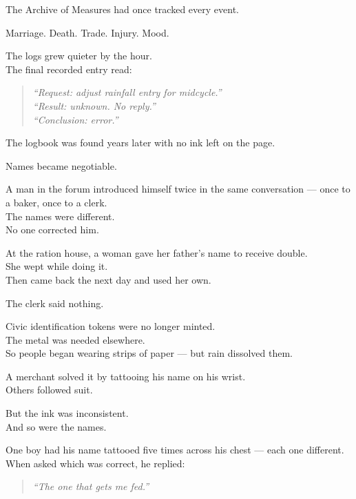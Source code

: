 \documentclass[9pt]{article}
\begin{document}
\vspace{1em}

The Archive of Measures had once tracked every event.

Marriage. Death. Trade. Injury. Mood.

The logs grew quieter by the hour.\\
The final recorded entry read:

\begin{quote}
\textit{“Request: adjust rainfall entry for midcycle.”}\\
\textit{“Result: unknown. No reply.”}\\
\textit{“Conclusion: error.”}
\end{quote}

The logbook was found years later with no ink left on the page.

\vspace{1em}

Names became negotiable.

A man in the forum introduced himself twice in the same conversation — once to a baker, once to a clerk.\\
The names were different.\\
No one corrected him.

At the ration house, a woman gave her father’s name to receive double.\\
She wept while doing it.\\
Then came back the next day and used her own.

The clerk said nothing.

\vspace{1em}

Civic identification tokens were no longer minted.\\
The metal was needed elsewhere.\\
So people began wearing strips of paper — but rain dissolved them.

A merchant solved it by tattooing his name on his wrist.\\
Others followed suit.

But the ink was inconsistent.\\
And so were the names.

One boy had his name tattooed five times across his chest — each one different.\\
When asked which was correct, he replied:

\begin{quote}
\textit{“The one that gets me fed.”}
\end{quote}
\end{document}
